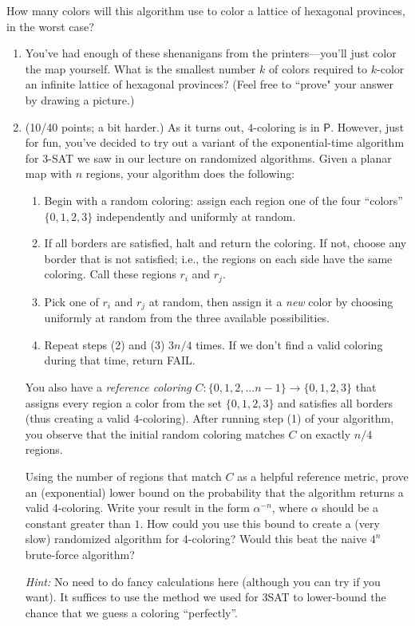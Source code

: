 \documentclass[12 pt, letterpaper]{hmcpset}
\begin{document}
\begin{problem}
	How many colors will this algorithm use to color a lattice of hexagonal provinces, in the worst case?
\begin{enumerate}
	\item[(f)] You've had enough of these shenanigans from the printers---you'll just color the map yourself. What is the smallest number $k$ of colors required to $k$-color an infinite lattice of hexagonal provinces? (Feel free to ``prove" your answer by drawing a picture.)

	\item[(g)] (10/40 points; a bit harder.) As it turns out, $4$-coloring is in $\mathsf{P}$. However, just for fun, you've decided to try out a variant of the exponential-time algorithm for 3-SAT we saw in our lecture on randomized algorithms. Given a planar map with $n$ regions, your algorithm does the following:

    \begin{enumerate}[label = (\arabic*)]
        \item Begin with a random coloring: assign each region one of the four ``colors'' $\{0, 1, 2, 3\}$ independently and uniformly at random.
        \item If all borders are satisfied, halt and return the coloring. If not, choose any border that is not satisfied; i.e., the regions on each side have the same coloring. Call these regions $r_i$ and $r_j$.
        \item Pick one of $r_i$ and $r_j$ at random, then assign it a \emph{new} color by choosing uniformly at random from the three available possibilities.
        \item Repeat steps (2) and (3) $3n/4$ times. If we don't find a valid coloring during that time, return FAIL.
    \end{enumerate}

    You also have a \emph{reference coloring} $C: \{0, 1, 2, ... n-1\} \rightarrow \{0, 1, 2, 3\}$ that assigns every region a color from the set $\{0, 1, 2, 3\}$ and satisfies all borders (thus creating a valid 4-coloring). After running step (1) of your algorithm, you observe that the initial random coloring matches $C$ on exactly $n/4$ regions. 

    Using the number of regions that match $C$ as a helpful reference metric, prove an (exponential) lower bound on the probability that the algorithm returns a valid 4-coloring. Write your result in the form $\alpha^{-n}$, where $\alpha$ should be a constant greater than $1$. How could you use this bound to create a (very slow) randomized algorithm for 4-coloring? Would this beat the naive $4^n$ brute-force algorithm?

    \emph{Hint:} No need to do fancy calculations here (although you can try if you want). It suffices to use the method we used for 3SAT to lower-bound the chance that we guess a coloring ``perfectly''.
\end{enumerate}
\end{problem}
\end{document}
